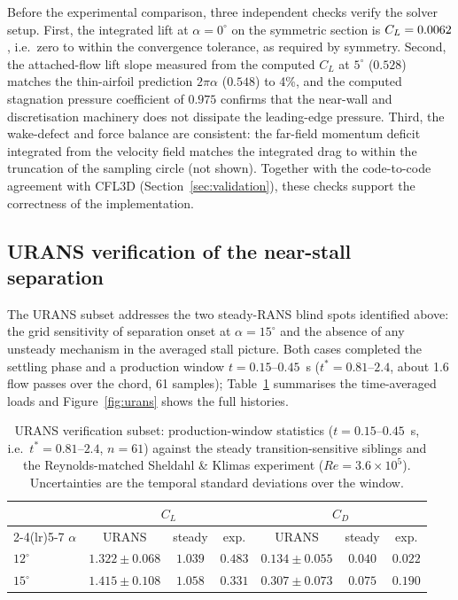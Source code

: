 \documentclass[11pt,a4paper]{article}
\begin{document}
Before the experimental comparison, three independent checks verify the solver setup. First, the integrated lift at $\alpha = 0^\circ$ on the symmetric section is $C_L = 0.0062$, i.e.\ zero to within the convergence tolerance, as required by symmetry. Second, the attached-flow lift slope measured from the computed $C_L$ at $5^\circ$ ($0.528$) matches the thin-airfoil prediction $2\pi\alpha$ ($0.548$) to 4\%, and the computed stagnation pressure coefficient of $0.975$ confirms that the near-wall and discretisation machinery does not dissipate the leading-edge pressure. Third, the wake-defect and force balance are consistent: the far-field momentum deficit integrated from the velocity field matches the integrated drag to within the truncation of the sampling circle (not shown). Together with the code-to-code agreement with CFL3D (Section~\ref{sec:validation}), these checks support the correctness of the implementation.

\subsection{URANS verification of the near-stall separation}\label{sec:urans}
The URANS subset addresses the two steady-RANS blind spots identified above: the grid sensitivity of separation onset at $\alpha = 15^\circ$ and the absence of any unsteady mechanism in the averaged stall picture. Both cases completed the settling phase and a production window $t = 0.15$--$0.45$~s ($t^* = 0.81$--$2.4$, about 1.6 flow passes over the chord, 61 samples); Table~\ref{tab:urans} summarises the time-averaged loads and Figure~\ref{fig:urans} shows the full histories.

\begin{table}[htbp]
  \centering
  \caption{URANS verification subset: production-window statistics ($t = 0.15$--$0.45$~s, i.e.\ $t^* = 0.81$--$2.4$, $n = 61$) against the steady transition-sensitive siblings and the Reynolds-matched Sheldahl \& Klimas experiment ($Re = 3.6\times10^5$). Uncertainties are the temporal standard deviations over the window.}
  \label{tab:urans}
  \begin{tabular}{lcccccc}
    \toprule
    & \multicolumn{3}{c}{$C_L$} & \multicolumn{3}{c}{$C_D$} \\
    \cmidrule(lr){2-4}\cmidrule(lr){5-7}
    $\alpha$ & URANS & steady & exp. & URANS & steady & exp. \\
    \midrule
    $12^\circ$ & $1.322 \pm 0.068$ & $1.039$ & $0.483$ & $0.134 \pm 0.055$ & $0.040$ & $0.022$ \\
    $15^\circ$ & $1.415 \pm 0.108$ & $1.058$ & $0.331$ & $0.307 \pm 0.073$ & $0.075$ & $0.190$ \\
    \bottomrule
  \end{tabular}
\end{table}
\end{document}
